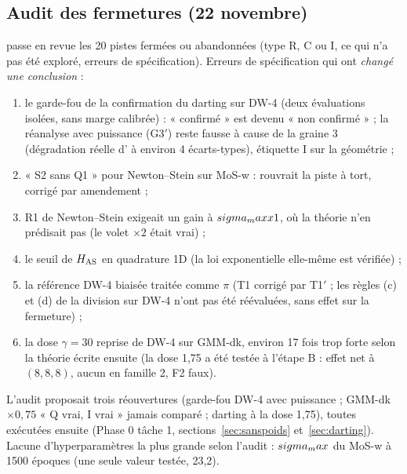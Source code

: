 \subsection{Audit des fermetures (22 novembre)}
 passe en revue les 20 pistes fermées ou abandonnées (type R, C ou I, ce qui n'a pas été exploré, erreurs de spécification). Erreurs de spécification qui ont \emph{changé une conclusion} :
\begin{enumerate}
  \item le garde-fou  de la confirmation du darting sur DW-4 (deux évaluations isolées, sans marge calibrée) : « confirmé » est devenu « non confirmé » ; la réanalyse avec puissance (G3$'$) reste fausse à cause de la graine 3 (dégradation réelle d' à environ 4 écarts-types), étiquette I sur la géométrie ;
  \item « S2 sans Q1 » pour Newton--Stein sur MoS-w : rouvrait la piste à tort, corrigé par amendement ;
  \item R1 de Newton--Stein exigeait un gain à $sigma_maxx1$, où la théorie n'en prédisait pas (le volet $\times2$ était vrai) ;
  \item le seuil de $H_{\rm AS}$ en quadrature 1D (la loi exponentielle elle-même est vérifiée) ;
  \item la référence DW-4 biaisée traitée comme $\pi$ (T1 corrigé par T1$'$ ; les règles (c) et (d) de la division sur DW-4 n'ont pas été réévaluées, sans effet sur la fermeture) ;
  \item la dose $\gamma=30$ reprise de DW-4 sur GMM-dk, environ 17 fois trop forte selon la théorie écrite ensuite (la dose 1,75 a été testée à l'étape B : effet net à $(8,8,8)$, aucun en famille 2, F2 faux).
\end{enumerate}
L'audit proposait trois réouvertures (garde-fou DW-4 avec puissance ; GMM-dk $\times0{,}75$ « Q vrai, I vrai » jamais comparé ; darting à la dose 1,75), toutes exécutées ensuite (Phase 0 tâche 1, sections~\ref{sec:sanspoids} et~\ref{sec:darting}). Lacune d'hyperparamètres la plus grande selon l'audit : $sigma_max$ du MoS-w à 1500 époques (une seule valeur testée, 23,2).

